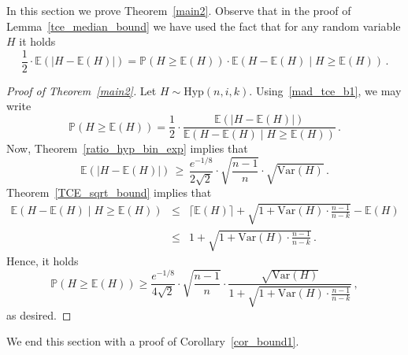 \documentclass[10pt]{article}
\theoremstyle{plain}
\theoremstyle{definition}
\theoremstyle{remark}
\newcommand{\Prb}{\mathbb{P}}
\newcommand{\Exp}{\mathbb{E}}
\begin{document}
In this section we prove Theorem~\ref{main2}. 
Observe that in the proof of Lemma~\ref{tce_median_bound} we have used the fact that for any random variable $H$ it holds 
\begin{equation}\label{mad_tce_b1}
\frac{1}{2}\cdot \Exp(|H - \Exp(H)|) = \Prb(H\ge \Exp(H))\cdot \Exp(H - \Exp(H)\mid H\ge \Exp(H)) \, .
\end{equation}



\begin{proof}[Proof of Theorem~\ref{main2}]
Let $H\sim\text{Hyp}(n,i,k)$. Using~\eqref{mad_tce_b1}, we may write   
\[
\Prb(H\ge \Exp(H)) = \frac{1}{2}\cdot \frac{\Exp(|H - \Exp(H)|)}{\Exp(H - \Exp(H)\mid H\ge \Exp(H))} \, .
\]
Now, Theorem~\ref{ratio_hyp_bin_exp} implies that 
\begin{equation}\label{mad_b1}
\Exp(|H - \Exp(H)|) \,\ge\,   
 \frac{e^{-1/8}}{2\sqrt{2}}\cdot \sqrt{\frac{n-1}{n}} \cdot \sqrt{\text{Var}(H)}  \, . 
\end{equation}
Theorem~\ref{TCE_sqrt_bound} implies that 
\begin{eqnarray*}
\Exp(H - \Exp(H)\mid H\ge \Exp(H)) &\le& \lceil\Exp(H)\rceil  + \sqrt{1+\text{Var}(H) \cdot \frac{n-1}{n-k}} - \Exp(H) \\ 
&\le&  1 + \sqrt{1 +\text{Var}(H) \cdot \frac{n-1}{n-k} } \, .
\end{eqnarray*}
Hence, it holds 
\[
\Prb(H\ge \Exp(H)) \ge \frac{e^{-1/8}}{4\sqrt{2}} \cdot \sqrt{\frac{n-1}{n}} \cdot\frac{ \sqrt{\text{Var}(H)} }{1 + \sqrt{1+\text{Var}(H) \cdot \frac{n-1}{n-k}}} \, ,
\]
as desired. 
\end{proof}

We end this section with a proof of Corollary~\ref{cor_bound1}. 
\end{document}
